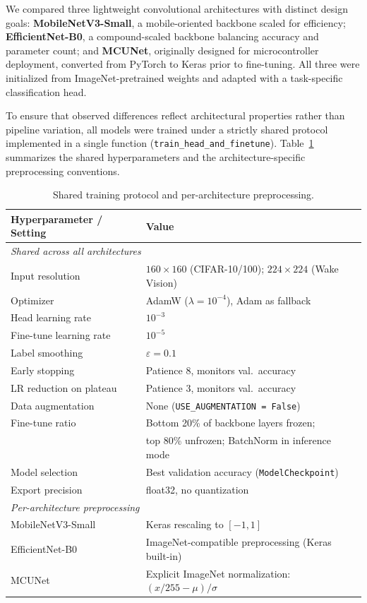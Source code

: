 \documentclass[runningheads]{llncs}
\begin{document}
We compared three lightweight convolutional architectures with distinct design
goals: \textbf{MobileNetV3-Small}, a mobile-oriented backbone scaled for
efficiency; \textbf{EfficientNet-B0}, a compound-scaled backbone balancing
accuracy and parameter count; and \textbf{MCUNet}, originally designed for
microcontroller deployment, converted from PyTorch to Keras prior to
fine-tuning. All three were initialized from ImageNet-pretrained weights and
adapted with a task-specific classification head.

To ensure that observed differences reflect architectural properties rather
than pipeline variation, all models were trained under a strictly shared
protocol implemented in a single function
(\texttt{train\_head\_and\_finetune}). Table~\ref{tab:training_protocol}
summarizes the shared hyperparameters and the architecture-specific
preprocessing conventions.

\begin{table}[ht]
\centering
\caption{Shared training protocol and per-architecture preprocessing.}
\label{tab:training_protocol}
\begin{tabular}{ll}
\toprule
\textbf{Hyperparameter / Setting} & \textbf{Value} \\
\midrule
\multicolumn{2}{l}{\textit{Shared across all architectures}} \\
\midrule
Input resolution        & $160\times160$ (CIFAR-10/100);
                          $224\times224$ (Wake Vision) \\
Optimizer               & AdamW ($\lambda=10^{-4}$), Adam as fallback \\
Head learning rate      & $10^{-3}$ \\
Fine-tune learning rate & $10^{-5}$ \\
Label smoothing         & $\varepsilon = 0.1$ \\
Early stopping          & Patience 8, monitors val.\ accuracy \\
LR reduction on plateau & Patience 3, monitors val.\ accuracy \\
Data augmentation       & None (\texttt{USE\_AUGMENTATION = False}) \\
Fine-tune ratio         & Bottom 20\% of backbone layers frozen; \\
                        & top 80\% unfrozen; BatchNorm in inference mode \\
Model selection         & Best validation accuracy
                          (\texttt{ModelCheckpoint}) \\
Export precision        & float32, no quantization \\
\midrule
\multicolumn{2}{l}{\textit{Per-architecture preprocessing}} \\
\midrule
MobileNetV3-Small & Keras rescaling to $[-1, 1]$ \\
EfficientNet-B0   & ImageNet-compatible preprocessing (Keras built-in) \\
MCUNet            & Explicit ImageNet normalization:
                    $(x/255 - \mu)/\sigma$ \\
\bottomrule
\end{tabular}
\end{table}
\end{document}
